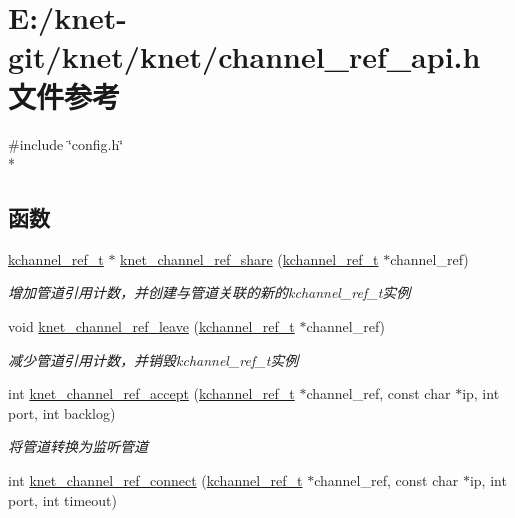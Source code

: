 \hypertarget{a00065}{}\section{E\+:/knet-\/git/knet/knet/channel\+\_\+ref\+\_\+api.h 文件参考}
\label{a00065}
{\ttfamily \#include \char`\"{}config.\+h\char`\"{}}\\*
\subsection*{函数}
\begin{DoxyCompactItemize}
\item 
\hyperlink{a00066_a3b7e82599367eade261456f60ebe2cd9_a3b7e82599367eade261456f60ebe2cd9}{kchannel\+\_\+ref\+\_\+t} $\ast$ \hyperlink{a00129_ga45710b87649c232603ae708616eddd85_ga45710b87649c232603ae708616eddd85}{knet\+\_\+channel\+\_\+ref\+\_\+share} (\hyperlink{a00066_a3b7e82599367eade261456f60ebe2cd9_a3b7e82599367eade261456f60ebe2cd9}{kchannel\+\_\+ref\+\_\+t} $\ast$channel\+\_\+ref)
\begin{DoxyCompactList}\small\item\em 增加管道引用计数，并创建与管道关联的新的kchannel\+\_\+ref\+\_\+t实例 \end{DoxyCompactList}\item 
void \hyperlink{a00129_ga6eded28dc89d84e8ed33615bbd205bae_ga6eded28dc89d84e8ed33615bbd205bae}{knet\+\_\+channel\+\_\+ref\+\_\+leave} (\hyperlink{a00066_a3b7e82599367eade261456f60ebe2cd9_a3b7e82599367eade261456f60ebe2cd9}{kchannel\+\_\+ref\+\_\+t} $\ast$channel\+\_\+ref)
\begin{DoxyCompactList}\small\item\em 减少管道引用计数，并销毁kchannel\+\_\+ref\+\_\+t实例 \end{DoxyCompactList}\item 
int \hyperlink{a00129_ga92a683023f347ae7c4eb692180884a01_ga92a683023f347ae7c4eb692180884a01}{knet\+\_\+channel\+\_\+ref\+\_\+accept} (\hyperlink{a00066_a3b7e82599367eade261456f60ebe2cd9_a3b7e82599367eade261456f60ebe2cd9}{kchannel\+\_\+ref\+\_\+t} $\ast$channel\+\_\+ref, const char $\ast$ip, int port, int backlog)
\begin{DoxyCompactList}\small\item\em 将管道转换为监听管道 \end{DoxyCompactList}\item 
int \hyperlink{a00129_gad8fc0ffe3928e6914b3ec50810e2e79f_gad8fc0ffe3928e6914b3ec50810e2e79f}{knet\+\_\+channel\+\_\+ref\+\_\+connect} (\hyperlink{a00066_a3b7e82599367eade261456f60ebe2cd9_a3b7e82599367eade261456f60ebe2cd9}{kchannel\+\_\+ref\+\_\+t} $\ast$channel\+\_\+ref, const char $\ast$ip, int port, int timeout)

\end{DoxyCompactItemize}
